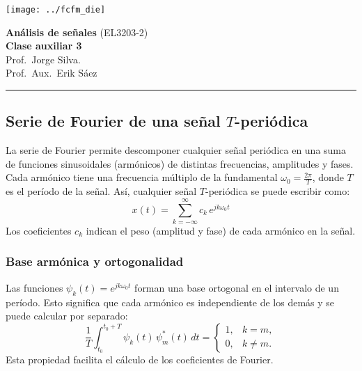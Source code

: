 \documentclass[
  11pt,
  letterpaper,
   addpoints,
   answers
  ]{exam}
\begin{document}
\noindent
\begin{minipage}{0.47\textwidth}
\texttt{[image: ../fcfm\_die]}
\end{minipage}
\begin{minipage}{0.53\textwidth}
\begin{center} 
\large\textbf{Análisis de señales} (EL3203-2) \\
\large\textbf{Clase auxiliar 3} \\
\normalsize Prof.~Jorge Silva.\\
\normalsize Prof.~Aux.~Erik Sáez
\end{center}
\end{minipage}

\vspace{0.5cm}
\noindent
\vspace{.85cm}
\noindent\rule{\textwidth}{0.4pt}
\subsection*{Serie de Fourier de una señal $T$-periódica}
La serie de Fourier permite descomponer cualquier señal periódica en una suma de funciones sinusoidales (armónicos) de distintas frecuencias, amplitudes y fases. Cada armónico tiene una frecuencia múltiplo de la fundamental $\omega_0=\tfrac{2\pi}{T}$, donde $T$ es el período de la señal. Así, cualquier señal $T$-periódica se puede escribir como:
\begin{equation}
  x(t) = \sum_{k=-\infty}^{\infty} c_k\,e^{jk\omega_0 t}
\end{equation}
Los coeficientes $c_k$ indican el peso (amplitud y fase) de cada armónico en la señal.

\subsubsection*{Base armónica y ortogonalidad}
Las funciones $\psi_k(t)=e^{jk\omega_0 t}$ forman una base ortogonal en el intervalo de un período. Esto significa que cada armónico es independiente de los demás y se puede calcular por separado:
\begin{equation}
  \frac{1}{T}\int_{t_0}^{t_0+T}\psi_k(t)\,\psi_m^{*}(t)\,dt = \begin{cases} 1,& k=m,\\ 0,& k\neq m. \end{cases}
\end{equation}
Esta propiedad facilita el cálculo de los coeficientes de Fourier.
\end{document}
